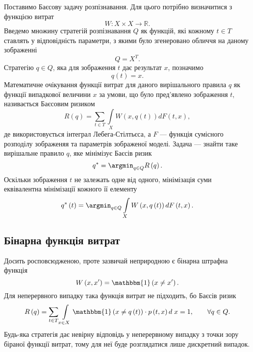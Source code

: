 Поставимо Баєсову задачу розпізнавання.
Для цього потрібно визначитися з функцією витрат
\cite{berger1980}
\begin{equation*}
  W: X \times X \rightarrow \mathbb{R}.
\end{equation*}
Введемо множину стратегій розпізнавання $Q$ як функцій,
які кожному $t \in T$ ставлять у відповідність параметри,
з якими було згенеровано обличчя на даному зображенні
\begin{equation*}
  Q = X^T.
\end{equation*}
Стратегію $q \in Q$, яка для зображення $t$ дає результат $x$, позначимо
\begin{equation*}
  q\left( t \right) = x.
\end{equation*}
Математичне очікування функції витрат для даного вирішального правила $q$
як функції випадкової величини $x$ за умови,
що було пред'явлено зображення $t$, називається Баєсовим ризиком
\cite{schlesinger:2002}
\begin{equation*}
  R \left( q \right)
  = \sum\limits_{t \in T} \int\limits_{X}
    W \left( x, q\left( t \right) \right)
    d F\left( t, x \right),
\end{equation*}
де використовується інтеграл Лебега-Стілтьєса,
а $F$ --- функція сумісного розподілу зображеняя
та параметрів зображеної моделі.
Задача --- знайти таке вирішальне правило $q$, яке мінімізує Баєсів ризик
\cite{wald1955selected}
\begin{equation*}
  q^* = \argmin_{q \in Q} R\left( q \right).
\end{equation*}
Оскільки зображення $t$ не залежать одне від одного,
мінімізація суми еквівалентна мінімізації кожного її елементу
\begin{equation*}
  q^*\left( t \right) = \argmin_{q \in Q} \int\limits_{X}
    W \left( x, q\left( t \right) \right)
    d F\left( t, x \right).
\end{equation*}

\subsection{Бінарна функція витрат}

Досить росповсюдженою, проте зазвичай неприродною є бінарна штрафна функція
\begin{equation*}
  W \left( x, x' \right)
  = \mathbbm{1} \left( x \neq x' \right).
\end{equation*}
Для неперервного випадку така функція витрат не підходить,
бо Баєсів ризик
\begin{equation*}
  R \left( q \right)
  = \sum\limits_{t \in T}
    \int\limits_{x \in X}
    \mathbbm{1} \left( x \neq q\left( t \right) \right)
    \cdot p\left( t, x \right) d\; x
  = 1,\qquad
  \forall q \in Q.
\end{equation*}
Будь-яка стратегія дає невірну відповідь у неперервному випадку
з точки зору біраної функції витрат,
тому для неї буде розглядатися лише дискретний випадок.

